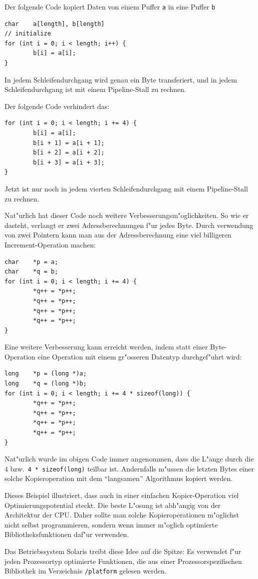 \begin{beispiel}
Der folgende Code kopiert Daten von einem Puffer {\tt a} in eine Puffer {\tt b}
\begin{verbatim}
char    a[length], b[length]
// initialize
for (int i = 0; i < length; i++) {
        b[i] = a[i];
}
\end{verbatim}
In jedem Schleifendurchgang wird genau ein Byte transferiert, und in jedem
Schleifendurchgang ist mit einem Pipeline-Stall zu rechnen. 

Der folgende Code verhindert das:
\begin{verbatim}
for (int i = 0; i < length; i += 4) {
        b[i] = a[i];
        b[i + 1] = a[i + 1];
        b[i + 2] = a[i + 2];
        b[i + 3] = a[i + 3];
}
\end{verbatim}
Jetzt ist nur noch in jedem vierten Schleifendurchgang mit einem Pipeline-Stall
zu rechnen.

Nat"urlich hat dieser Code noch weitere Verbesserungsm"oglichkeiten.
So wie er dasteht, verlangt er zwei Adressberechnungen f"ur jedes Byte.
Durch verwendung von zwei Pointern kann man aus der Adressberechnung
eine viel billigeren Increment-Operation machen:
\begin{verbatim}
char    *p = a;
char    *q = b;
for (int i = 0; i < length; i += 4) {
        *q++ = *p++;
        *q++ = *p++;
        *q++ = *p++;
        *q++ = *p++;
}
\end{verbatim}
Eine weitere Verbesserung kann erreicht werden, indem statt einer
Byte-Operation eine Operation mit einem gr"osseren Datentyp durchgef"uhrt wird:
\begin{verbatim}
long    *p = (long *)a;
long    *q = (long *)b;
for (int i = 0; i < length; i += 4 * sizeof(long)) {
        *q++ = *p++;
        *q++ = *p++;
        *q++ = *p++;
        *q++ = *p++;
}
\end{verbatim}
Nat"urlich wurde im obigen Code immer angenommen, dass die L"ange durch
die $4$ bzw.~\verb+4 * sizeof(long)+ teilbar ist.
Andernfalls m"ussen die letzten Bytes einer solche Kopieroperation mit
dem ``langsamen'' Algorithmus kopiert werden.

Dieses Beispiel illustriert, dass auch in einer einfachen Kopier-Operation
viel Optimierungspotential steckt. Die beste L"osung  ist abh"angig von der
Architektur der CPU. Daher sollte man solche Kopieroperationen m"oglichst
nicht selbst programmieren, sondern wenn immer m"oglich optimierte
Bibliotheksfunktionen daf"ur verwenden.

Das Betriebssystem Solaris treibt diese Idee auf die Spitze:
Es verwendet f"ur jeden Prozessortyp optimierte
Funktionen, die aus einer Prozessorspezifischen Bibliothek
im Verzeichnis \verb+/platform+ gelesen werden.
\end{beispiel}

